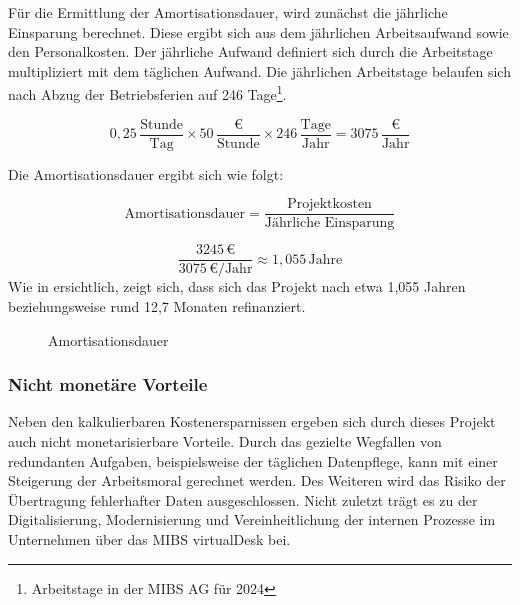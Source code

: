 
Für die Ermittlung der Amortisationsdauer, wird zunächst die jährliche Einsparung berechnet. Diese ergibt sich aus dem jährlichen Arbeitsaufwand sowie den Personalkosten. Der jährliche Aufwand definiert sich durch die Arbeitstage multipliziert mit dem täglichen Aufwand. Die jährlichen Arbeitstage belaufen sich nach Abzug der Betriebsferien auf 246 Tage\footnote{Arbeitstage in der MIBS AG für 2024}.

\[
0{,}25 \, \frac{\text{Stunde}}{\text{Tag}} \times 50 \, \frac{\text{€}}{\text{Stunde}} \times 246 \, \frac{\text{Tage}}{\text{Jahr}} = 3075 \, \frac{\text{€}}{\text{Jahr}}
\]

Die Amortisationsdauer ergibt sich wie folgt:

\[
\text{Amortisationsdauer} = \frac{\text{Projektkosten}}{\text{Jährliche Einsparung}}
\]

\[
\frac{3245\,\text{€}}{3075\,\text{€/Jahr}} \approx 1{,}055 \, \text{Jahre}
\]
Wie in  ersichtlich, zeigt sich, dass sich das Projekt nach etwa 1,055 Jahren beziehungsweise rund 12,7 Monaten refinanziert.


\begin{figure}[htb]
\centering
{}
\caption{Amortisationsdauer}
\label{fig:Amortisationsdauer}
\end{figure}

\subsubsection{Nicht monetäre Vorteile}
\label{sec:Nicht monetäre Vorteile}
Neben den kalkulierbaren Kostenersparnissen ergeben sich durch dieses Projekt auch nicht monetarisierbare Vorteile. Durch das gezielte Wegfallen von redundanten Aufgaben, beispielsweise der täglichen Datenpflege, kann mit einer Steigerung der Arbeitsmoral gerechnet werden. 
Des Weiteren wird das Risiko der Übertragung fehlerhafter Daten ausgeschlossen. 
Nicht zuletzt trägt es zu der Digitalisierung, Modernisierung und Vereinheitlichung der internen Prozesse im Unternehmen über das MIBS virtualDesk bei.


